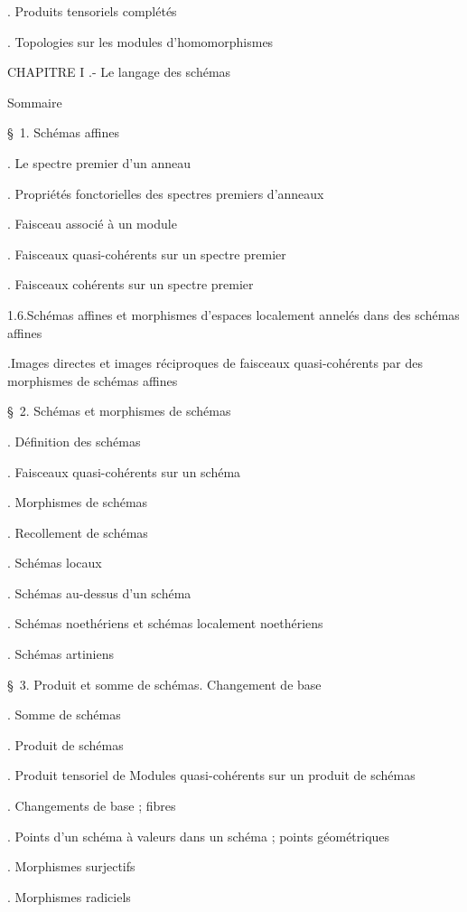 
\noindent{}. Produits tensoriels complétés\dotfill

\noindent{}. Topologies sur les modules d'homomorphismes\dotfill

\noindent CHAPITRE I .- Le langage des schémas\dotfill

\noindent\quad Sommaire\dotfill

\noindent\quad \S\ 1. Schémas affines\dotfill

\noindent{}. Le spectre premier d'un anneau\dotfill

\noindent{}. Propriétés fonctorielles des spectres premiers d'anneaux\dotfill

\noindent{}. Faisceau associé à un module\dotfill

\noindent{}. Faisceaux quasi-cohérents sur un spectre premier\dotfill

\noindent{}. Faisceaux cohérents sur un spectre premier\dotfill

\noindent\qquad {}1.6.Schémas affines et morphismes d'espaces localement annelés dans des schémas affines\dotfill

\noindent{}.Images directes et images réciproques de faisceaux quasi-cohérents par des morphismes de schémas affines\dotfill

\noindent\quad \S\ 2. Schémas et morphismes de schémas\dotfill

\noindent{}. Définition des schémas\dotfill

\noindent{}. Faisceaux quasi-cohérents sur un schéma\dotfill

\noindent{}. Morphismes de schémas\dotfill

\noindent{}. Recollement de schémas\dotfill

\noindent{}. Schémas locaux\dotfill

\noindent{}. Schémas au-dessus d'un schéma\dotfill

\noindent{}. Schémas noethériens et schémas localement noethériens\dotfill

\noindent{}. Schémas artiniens\dotfill

\noindent\quad \S\ 3. Produit et somme de schémas. Changement de base\dotfill

\noindent{}. Somme de schémas\dotfill

\noindent{}. Produit de schémas\dotfill

\noindent{}. Produit tensoriel de Modules quasi-cohérents sur un produit de schémas\dotfill

\noindent{}. Changements de base ; fibres\dotfill

\noindent{}. Points d'un schéma à valeurs dans un schéma ; points géométriques\dotfill

\noindent{}. Morphismes surjectifs\dotfill

\noindent{}. Morphismes radiciels\dotfill

